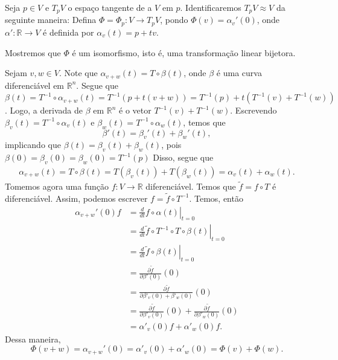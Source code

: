 \begin{lemma}
    \label{loc:!resultados_extras_importantes!.identificar_nesse_espaço_vetorial_v_o_espaço_tangente_t_pv_com_v.}
    Seja $p \in V$ e $T_{p}V$ o espaço tangente de a $V$ em $p$. Identificaremos $T_{p}V \approx V$ da seguinte maneira:
    Defina $\Phi=\Phi_{p}:V\to T_{p}V$, pondo $\Phi(v)=\alpha_{v}'(0)$, onde $\alpha':\mathbb{R}\to V$ é definida por $\alpha_{v}(t)=p+tv$.

    Mostremos que $\Phi$ é um isomorfismo, isto é, uma transformação linear bijetora.

    Sejam $v ,w \in V$. Note que $\alpha_{v+w}(t)=T \circ \beta(t)$, onde $\beta$ é uma curva diferenciável em $\mathbb{R}^{n}$.
    Segue que $\beta(t)=T^{-1} \circ\alpha_{v+w}(t)=T^{-1}(p + t(v+w))=T^{-1}(p)+t(T^{-1}(v)+T^{-1}(w))$. Logo, a derivada de $\beta$ em $\mathbb{R}^{n}$ é o vetor $T^{-1}(v)+T^{-1}(w)$.
    Escrevendo $\beta_{v}(t)=T^{-1}\circ\alpha_{v}(t)$ e $\beta_{w}(t)=T^{-1} \circ \alpha_{w}(t)$, temos que
    \begin{equation*}
        \beta'(t)=\beta_{v}'(t)+\beta_{w}'(t),
    \end{equation*}
    implicando que $\beta(t)=\beta_{v}(t)+\beta_{w}(t)$, pois $\beta(0)=\beta_{v}(0)=\beta_{w}(0)=T^{-1}(p)$
    Disso, segue que
    \begin{align*}
        \alpha_{v+w}(t)=T \circ \beta(t)=T(\beta_{v}(t))+T(\beta_{w}(t))=\alpha_{v}(t)+\alpha_{w}(t).
    \end{align*}
    Tomemos agora uma função $f:V\to \mathbb{R}$ diferenciável. Temos que $\tilde{f}=f \circ T$ é diferenciável. Assim, podemos escrever $f=\tilde{f}\circ T ^{-1}$.
    Temos, então
    \begin{align*}
        \alpha_{v+w}'(0)f & =\left.\frac{d}{dt}f \circ \alpha(t)\right|_{t=0}                                                           \\
                          & = \left.\frac{d}{dt}\tilde{f} \circ T^{-1} \circ  T \circ \beta(t)\right|_{t=0}                             \\
                          & = \left.\frac{d}{dt}\tilde{f} \circ \beta(t)\right|_{t=0}                                                   \\
                          & =\frac{\partial \tilde{f}}{\partial\beta'(0)}(0)\                                                           \\
                          & =\frac{\partial \tilde{f}}{\partial\beta'_{v}(0)+\beta'_{w}(0)}(0)                                          \\
                          & = \frac{\partial \tilde{f}}{\partial\beta'_{v}(0)}(0) + \frac{\partial \tilde{f}}{\partial\beta'_{w}(0)}(0) \\
                          & =\alpha'_{v}(0)f + \alpha'_{w}(0)f.
    \end{align*}
    Dessa maneira,
    \begin{equation*}
        \Phi(v+w)=\alpha_{v+w}'(0)=\alpha'_{v}(0)+\alpha'_{w}(0)=\Phi(v)+\Phi(w).
    \end{equation*}


\end{lemma}
